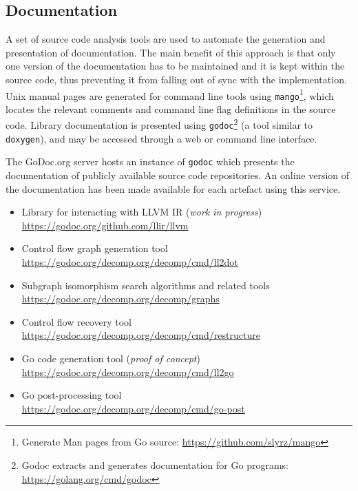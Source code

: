 
\subsection{Documentation}

A set of source code analysis tools are used to automate the generation and presentation of documentation. The main benefit of this approach is that only one version of the documentation has to be maintained and it is kept within the source code, thus preventing it from falling out of sync with the implementation. Unix manual pages are generated for command line tools using \texttt{mango}\footnote{Generate Man pages from Go source: \url{https://github.com/slyrz/mango}}, which locates the relevant comments and command line flag definitions in the source code. Library documentation is presented using \texttt{godoc}\footnote{Godoc extracts and generates documentation for Go programs: \url{https://golang.org/cmd/godoc}} (a tool similar to \texttt{doxygen}), and may be accessed through a web or command line interface.

The GoDoc.org server hosts an instance of \texttt{godoc} which presents the documentation of publicly available source code repositories. An online version of the documentation has been made available for each artefact using this service.

\begin{itemize}
	\item Library for interacting with LLVM IR (\textit{work in progress}) \\ \url{https://godoc.org/github.com/llir/llvm}
	\item Control flow graph generation tool \\ \url{https://godoc.org/decomp.org/decomp/cmd/ll2dot}
	\item Subgraph isomorphism search algorithms and related tools \\ \url{https://godoc.org/decomp.org/decomp/graphs}
	\item Control flow recovery tool \\ \url{https://godoc.org/decomp.org/decomp/cmd/restructure}
	\item Go code generation tool (\textit{proof of concept}) \\ \url{https://godoc.org/decomp.org/decomp/cmd/ll2go}
	\item Go post-processing tool \\ \url{https://godoc.org/decomp.org/decomp/cmd/go-post}
\end{itemize}
